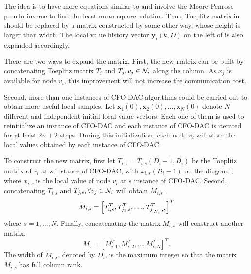 The idea is to have more equations similar to  
and involve the Moore-Penrose pseudo-inverse to find the least mean
square solution. Thus, Toeplitz matrix in  
should be replaced by a matrix constructed by some other way, whose
height is larger than width. The local value history vector $\mathbf{y}_{i}\left(k,D\right)$
on the left of   is also expanded accordingly. 

There are two ways to expand the matrix. First, the new matrix can
be built by concatenating   Toeplitz matrix $T_{i}$  and $T_{j},v_{j}\in{\cal N}_{i}$
along the column.  As $x_{j}$ is available for node $v_{i}$, this
improvement will not increase the communication cost. 

Second, more than one instances of CFO-DAC algorithms could be carried
out to obtain more useful local samples. Let $\mathbf{x}_{1}\left(0\right),\mathbf{x}_{2}\left(0\right),\ldots,\mathbf{x}_{N}\left(0\right)$
denote $N$ different and independent initial local value vectors.
 Each one of them is used to reinitialize an instance of CFO-DAC and
  each instance of CFO-DAC is iterated for at least $2n+2$ steps.
During this initialization, each node $v_{i}$ will store the local
values obtained by each instance of CFO-DAC.

To construct the new matrix, first let $T_{i,s}=T_{i,s}\left(D_{i}-1,D_{i}\right)$
be the Toeplitz matrix of $v_{i}$ at $s$ instance of CFO-DAC, with
$x_{i,s}\left(D_{i}-1\right)$ on the diagonal, where $x_{i,s}$ is
the local value of node $v_{i}$ at $s$ instance of CFO-DAC. Second,
concatenating $T_{i,s}$ and $T_{j,s},\forall v_{j}\in{\cal N}_{i}$
will obtain $M_{i,s}$.
\begin{equation}
M_{i,s}=\left[T_{i,s}^{T},T_{j_{1},s}^{T},\ldots,T_{j_{\left|{\cal N}_{i}\right|},s}^{T}\right]^{T}
\end{equation}
where $s=1,...,N$.  Finally, concatenating the matrix $M_{i,s}$
will construct another matrix, 
\begin{equation}
\tilde{M}_{i}=\left[M_{i,1}^{T},M_{i,2}^{T},\ldots,M_{i,N}^{T}\right]^{T}.
\end{equation}
The width of $\tilde{M}_{i,s}$, denoted by $D_{i}$, is the maximum
integer so that the matrix $\tilde{M}_{i,s}$ has full column rank. 

